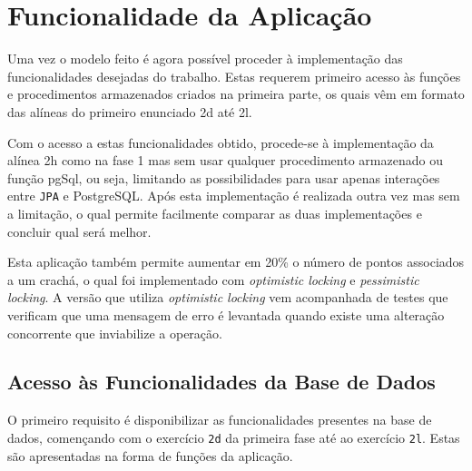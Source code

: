 %
%
\chapter{Funcionalidade da Aplicação} \label{cap3}

Uma vez o modelo feito é agora possível proceder à implementação das funcionalidades desejadas do trabalho. Estas requerem primeiro acesso às funções e procedimentos
armazenados criados na primeira parte, os quais vêm em formato das alíneas do primeiro enunciado 2d até 2l.

Com o acesso a estas funcionalidades obtido, procede-se à implementação da alínea 2h como na fase 1 mas sem usar qualquer procedimento armazenado ou função pgSql,
ou seja, limitando as possibilidades para usar apenas interações entre \texttt{JPA} e PostgreSQL. Após esta implementação é realizada outra vez mas sem a limitação,
o qual permite facilmente comparar as duas implementações e concluir qual será melhor.

Esta aplicação também permite aumentar em 20\% o número de pontos associados a um crachá, o qual foi implementado com \textit{optimistic locking} e \textit{pessimistic
locking}. A versão que utiliza \textit{optimistic locking} vem acompanhada de testes que verificam que uma mensagem de erro é levantada quando existe uma alteração
concorrente que inviabilize a operação.

%
%
\section{Acesso às Funcionalidades da Base de Dados} \label{sec31}

O primeiro requisito é disponibilizar as funcionalidades presentes na base de dados, començando com o exercício \texttt{2d} da primeira fase até ao exercício \texttt{2l}.
Estas são apresentadas na forma de funções da aplicação.

